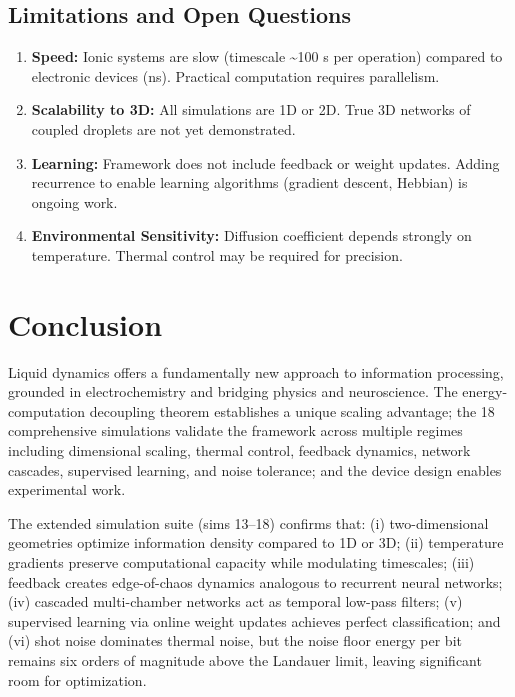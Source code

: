 \documentclass[11pt]{article}
\begin{document}
\subsection{Limitations and Open Questions}

\begin{enumerate}
\item \textbf{Speed:} Ionic systems are slow (timescale \textasciitilde 100 s per operation) compared to electronic devices (ns). Practical computation requires parallelism.

\item \textbf{Scalability to 3D:} All simulations are 1D or 2D. True 3D networks of coupled droplets are not yet demonstrated.

\item \textbf{Learning:} Framework does not include feedback or weight updates. Adding recurrence to enable learning algorithms (gradient descent, Hebbian) is ongoing work.

\item \textbf{Environmental Sensitivity:} Diffusion coefficient depends strongly on temperature. Thermal control may be required for precision.

\end{enumerate}

\section{Conclusion}

Liquid dynamics offers a fundamentally new approach to information processing, grounded in electrochemistry and bridging physics and neuroscience. The energy-computation decoupling theorem establishes a unique scaling advantage; the 18 comprehensive simulations validate the framework across multiple regimes including dimensional scaling, thermal control, feedback dynamics, network cascades, supervised learning, and noise tolerance; and the device design enables experimental work.

The extended simulation suite (sims 13–18) confirms that: (i) two-dimensional geometries optimize information density compared to 1D or 3D; (ii) temperature gradients preserve computational capacity while modulating timescales; (iii) feedback creates edge-of-chaos dynamics analogous to recurrent neural networks; (iv) cascaded multi-chamber networks act as temporal low-pass filters; (v) supervised learning via online weight updates achieves perfect classification; and (vi) shot noise dominates thermal noise, but the noise floor energy per bit remains six orders of magnitude above the Landauer limit, leaving significant room for optimization.
\end{document}
